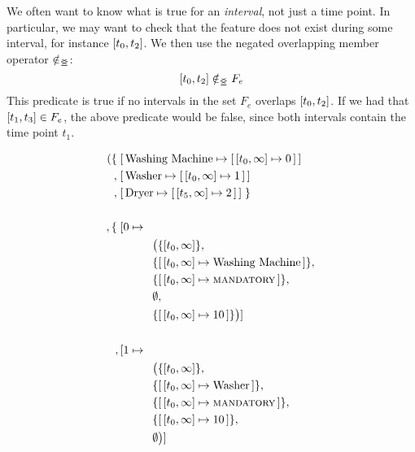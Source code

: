 We often want to know what is true for an \emph{interval}, not just a time point. In particular, we may want to check that the feature does not exist during some interval, for instance $\interval{t_0}{t_2}$. We then use the negated overlapping member operator $\notin_{\leq\!\!\!\!\geq{}}$:
\[
  \interval{t_0}{t_2} \notinnr F_e
\]
This predicate is true if no intervals in the set $F_e$ overlaps $\interval{t_0}{t_2}$. If we had that $\interval{t_1}{t_3} \in F_e$, the above predicate would be false, since both intervals contain the time point $t_1$.

\begin{figure}[htpb]
  \begin{align*}
    ( \{ \; & \mapping{\text{Washing Machine}}{\intervalmapping{t_0}{\forever}{0}} \\
       ,\; & \mapping{\text{Washer}}{\intervalmapping{t_0}{\forever}{1}} \\
       ,\; & \mapping{\text{Dryer}}{\intervalmapping{t_5}{\forever}{2}}\; \} \\
       \\
       ,\{\; & [ 0 \mapsto \\
             & \hspace{1cm} \begin{aligned} & \big(\{ \interval{t_0}{\forever}\} ,\, \\
             & \{\intervalmapping{t_0}{\forever}{\text{Washing Machine}}\} ,\, \\
             & \{\intervalmapping{t_0}{\forever}{\mandatory{}}\} ,\, \\
             &  \emptyset ,\, \\ 
             & \{\intervalmapping{t_0}{\forever}{10}\} \big) ] \\
             \end{aligned}\\
             &\\
         ,\, & [ 1 \mapsto \\
              & \hspace{1cm} \begin{aligned} & \big(\{\interval{t_0}{\forever}\} ,\, \\
             & \{\intervalmapping{t_0}{\forever}{\text{Washer}}\} ,\, \\
             & \{\intervalmapping{t_0}{\forever}{\mandatory{}}\} ,\, \\
             & \{\intervalmapping{t_0}{\forever}{10}\} ,\, \\ 
             & \emptyset\big)] \\

\end{aligned}
\end{align*}
\end{figure}

